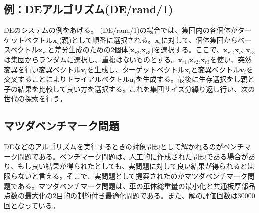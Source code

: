 \documentclass[twocolumn,10pt]{jarticle}
\begin{document}
\subsection{例：DEアルゴリズム(DE/rand/1)}
DEのシステムの例をあげる。
(DE/rand/1)の場合では、集団内の各個体がターゲットベクトル$\bm{x}_{i}$(親)として順番に選択される。$\bm{x}_{i}$に対して、個体集団からベースベクトル$\bm{x}_{r1}$と差分生成のための2個体($\bm{x}_{r2}$,$\bm{x}_{r3}$)を選択する。ここで、$\bm{x}_{r1}$,$\bm{x}_{r2}$,$\bm{x}_{r3}$は集団からランダムに選択し、重複はないものとする。$\bm{x}_{r1}$,$\bm{x}_{r2}$,$\bm{x}_{r3}$を使い、突然変異を行い変異ベクトル$\bm{v}_{i}$を生成し、ターゲットベクトル$\bm{x}_{i}$と変異ベクトル$\bm{v}_{i}$を交叉することによりトライアルベクトル$\bm{u}_{i}$を生成する。最後に生存選択をし親と子の結果を比較して良い方を選択する。これを集団サイズ分繰り返し行い、次の世代の探索を行う。


\subsection{マツダベンチマーク問題}
DEなどのアルゴリズムを実行するときの対象問題として解かれるのがベンチマーク問題である。ベンチマーク問題は、人工的に作成された問題である場合があり、もし良い結果が得られたとしても、実問題に対して良い結果が得られるとは限らないと言える。そこで、実問題として提案されたのがマツダベンチマーク問題である。マツダベンチマーク問題は、車の車体総重量の最小化と共通板厚部品点数の最大化の2目的の制約付き最適化問題である。また、解の評価回数は30000回となっている。
\end{document}
